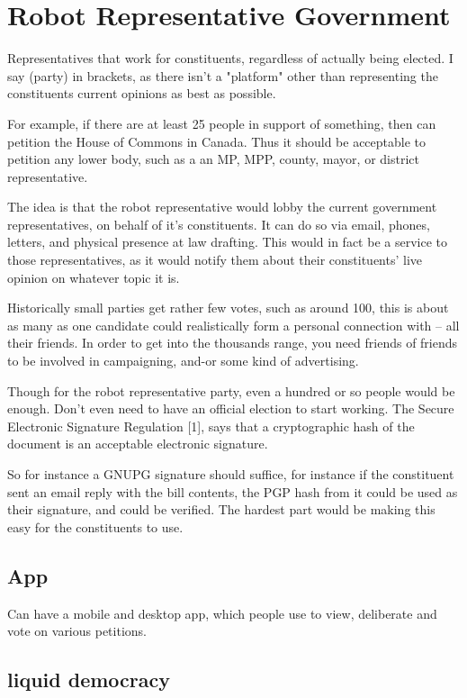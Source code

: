 \documentclass{report}
\begin{document}
\chapter{Robot Representative Government}
Representatives that work for constituents, regardless of actually being elected. I say (party) in brackets, as there isn't a "platform" other than representing the constituents current opinions as best as possible.

For example, if there are at least 25 people in support of something, then can petition the House of Commons in Canada. Thus it should be acceptable to petition any lower body, such as a an MP, MPP, county, mayor, or district representative.

The idea is that the robot representative would lobby the current government representatives, on behalf of it's constituents. It can do so via email, phones, letters, and physical presence at law drafting. This would in fact be a service to those representatives, as it would notify them about their constituents' live opinion on whatever topic it is.

Historically small parties get rather few votes, such as around 100, this is about as many as one candidate could realistically form a personal connection with -- all their friends.   In order to get into the thousands range, you need friends of friends to be involved in campaigning, and-or some kind of advertising.

Though for the robot representative party, even a hundred or so people would be enough.  Don't even need to have an official election to start working. The Secure Electronic Signature Regulation [1], says that a cryptographic hash of the document is an acceptable electronic signature.

So for instance a GNUPG signature should suffice, for instance if the constituent sent an email reply with the bill contents, the PGP hash from it could be used as their signature, and could be verified.  The hardest part would be making this easy for the constituents to use.

\section{App}

Can have a mobile and desktop app, which people use to view, deliberate and vote on various petitions.

\section{liquid democracy}
\end{document}
